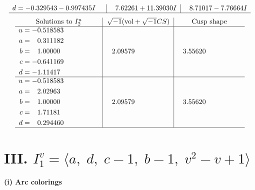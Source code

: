 \documentclass[1p]{elsarticle_modified}
\theoremstyle{definition}
\newcommand{\I}{\sqrt{-1}}
\begin{document}
$$\begin{array}{c|c|c}
\begin{aligned}
d &= -0.329543 - 0.997435 I\end{aligned}
 & \phantom{-}7.62261 + 11.39030 I & \phantom{-}8.71017 - 7.76664 I\\
 \hline 
 \end{array}$$\newpage$$\begin{array}{c|c|c}  
\text{Solutions to }I^u_{2}& \I (\text{vol} + \sqrt{-1}CS) & \text{Cusp shape}\\
 \hline 
\begin{aligned}
u &= -0.518583\phantom{ +0.000000I} \\
a &= \phantom{-}0.311182\phantom{ +0.000000I} \\
b &= \phantom{-}1.00000\phantom{ +0.000000I} \\
c &= -0.641169\phantom{ +0.000000I} \\
d &= -1.11417\phantom{ +0.000000I}\end{aligned}
 & \phantom{-}2.09579\phantom{ +0.000000I} & \phantom{-}3.55620\phantom{ +0.000000I} \\ \hline\begin{aligned}
u &= -0.518583\phantom{ +0.000000I} \\
a &= \phantom{-}2.02963\phantom{ +0.000000I} \\
b &= \phantom{-}1.00000\phantom{ +0.000000I} \\
c &= \phantom{-}1.71181\phantom{ +0.000000I} \\
d &= \phantom{-}0.294460\phantom{ +0.000000I}\end{aligned}
 & \phantom{-}2.09579\phantom{ +0.000000I} & \phantom{-}3.55620\phantom{ +0.000000I}\\
 \hline 
 \end{array}$$\newpage\newpage\renewcommand{\arraystretch}{1}
\centering \section*{III. $I^v_{1}= \langle a,\;d,\;c-1,\;b-1,\;v^2- v+1 \rangle$}
\flushleft \textbf{(i) Arc colorings}\\
\end{document}
